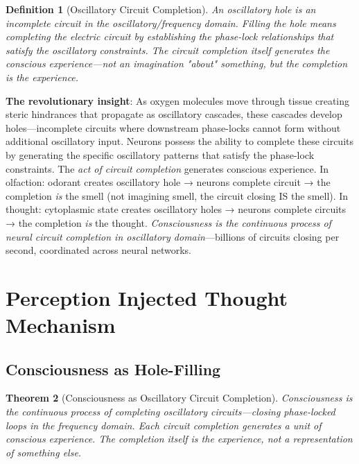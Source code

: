 \documentclass[11pt,a4paper]{article}
\newtheorem{theorem}{Theorem}
\newtheorem{definition}[theorem]{Definition}
\begin{document}
\begin{definition}[Oscillatory Circuit Completion]
An oscillatory hole is an incomplete circuit in the oscillatory/frequency domain. Filling the hole means \textit{completing the electric circuit} by establishing the phase-lock relationships that satisfy the oscillatory constraints. The circuit completion itself generates the conscious experience—not an imagination "about" something, but the completion \textit{is} the experience.
\end{definition}

\textbf{The revolutionary insight}: As oxygen molecules move through tissue creating steric hindrances that propagate as oscillatory cascades, these cascades develop holes—incomplete circuits where downstream phase-locks cannot form without additional oscillatory input. Neurons possess the ability to complete these circuits by generating the specific oscillatory patterns that satisfy the phase-lock constraints. The \textit{act of circuit completion} generates conscious experience. In olfaction: odorant creates oscillatory hole → neurons complete circuit → the completion \textit{is} the smell (not imagining smell, the circuit closing IS the smell). In thought: cytoplasmic state creates oscillatory holes → neurons complete circuits → the completion \textit{is} the thought. \textit{Consciousness is the continuous process of neural circuit completion in oscillatory domain}—billions of circuits closing per second, coordinated across neural networks.

\section{Perception Injected Thought Mechanism}

\subsection{Consciousness as Hole-Filling}

\begin{theorem}[Consciousness as Oscillatory Circuit Completion]
\label{thm:consciousness_mechanism}
Consciousness is the continuous process of completing oscillatory circuits—closing phase-locked loops in the frequency domain. Each circuit completion generates a unit of conscious experience. The completion itself \textit{is} the experience, not a representation of something else.
\end{theorem}
\end{document}
